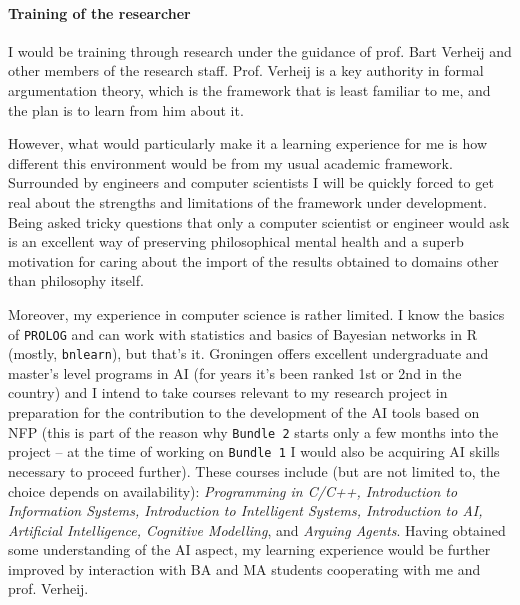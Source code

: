 \documentclass[11pt, a4paper]{article}
\begin{document}
 


\paragraph{Training of the researcher}

 I would be training through research under the guidance of prof. Bart Verheij and other members of the research staff. Prof. Verheij is a key authority in formal argumentation theory,  which is the framework that is least familiar to me, and the plan is to learn from him about it.

  However, what would particularly make it a learning experience for me is how different this environment would be from my usual academic framework. Surrounded by engineers and computer scientists I will be quickly forced to get real about the strengths and limitations of the framework under development. Being asked tricky questions that only a computer scientist or engineer would ask is an excellent way of preserving philosophical mental health and a superb motivation for caring about the import of the results obtained to domains other than philosophy itself. 


Moreover, my experience in computer science is rather limited. I know the basics of \verb|PROLOG| and can work with  statistics and basics of Bayesian networks in \textsf{R} (mostly, \verb|bnlearn|), but that's it. Groningen offers excellent undergraduate and master's level programs in AI (for years it's been ranked 1st or 2nd in the country) and I intend to take  courses relevant to my research project in preparation for the contribution to the development of the AI tools based on NFP (this is part of the reason why \verb|Bundle 2| starts only a few months into the project -- at the time of working on \verb|Bundle 1| I would also be acquiring AI skills necessary to proceed further). These courses  include (but are not limited to, the choice depends on availability): 
\emph{Programming in C/C++, Introduction to Information Systems, Introduction to Intelligent Systems, Introduction to AI, Artificial Intelligence, Cognitive Modelling}, and \emph{Arguing Agents}. Having obtained some understanding of the AI aspect, my learning experience would be further improved by interaction with BA and MA students cooperating with me and prof. Verheij. 
\end{document}

